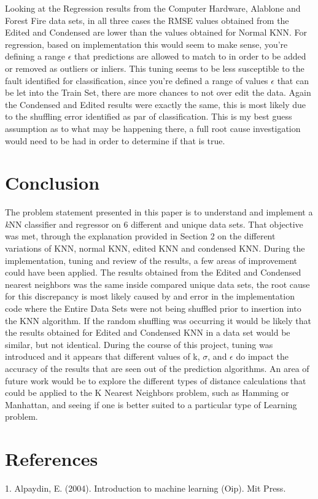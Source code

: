 \documentclass[twoside,11pt]{article}
\begin{document}
\hspace*{10mm} Looking at the Regression results from the Computer Hardware, Alablone and Forest Fire data sets, in all three cases the RMSE values obtained from the Edited and Condensed are lower than the values obtained for Normal KNN. For regression, based on implementation this would seem to make sense, you're defining a range $\epsilon$ that predictions are allowed to match to in order to be added or removed as outliers or inliers. This tuning seems to be less susceptible to the fault identified for classification, since you're defined a range of values $\epsilon$ that can be let into the Train Set, there are more chances to not over edit the data. Again the Condensed and Edited results were exactly the same, this is most likely due to the shuffling error identified as par of classification. This is my best guess assumption as to what may be happening there, a full root cause investigation would need to be had in order to determine if that is true. 

\section{Conclusion}
\hspace*{10mm} The problem statement presented in this paper is to understand and implement a \textit{k}NN classifier and regressor on 6 different and unique data sets. That objective was met, through the explanation provided in Section 2 on the different variations of KNN, normal KNN, edited KNN and condensed KNN. During the implementation, tuning and review of the results, a few areas of improvement could have been applied. The results obtained from the Edited and Condensed nearest neighbors was the same inside compared unique data sets, the root cause for this discrepancy is most likely caused by and error in the implementation code where the Entire Data Sets were not being shuffled prior to insertion into the KNN algorithm. If the random shuffling was occurring it would be likely that the results obtained for Edited and Condensed KNN in a data set would be similar, but not identical. During the course of this project, tuning was introduced and it appears that different values of k, $\sigma$, and $\epsilon$ do impact the accuracy of the results that are seen out of the prediction algorithms. An area of future work would be to explore the different types of distance calculations that could be applied to the K Nearest Neighbors problem, such as Hamming or Manhattan, and seeing if one is better suited to a particular type of Learning problem.  

\section{References}
1. Alpaydin, E. (2004). Introduction to machine learning (Oip). Mit Press. 

\newpage
\end{document}
